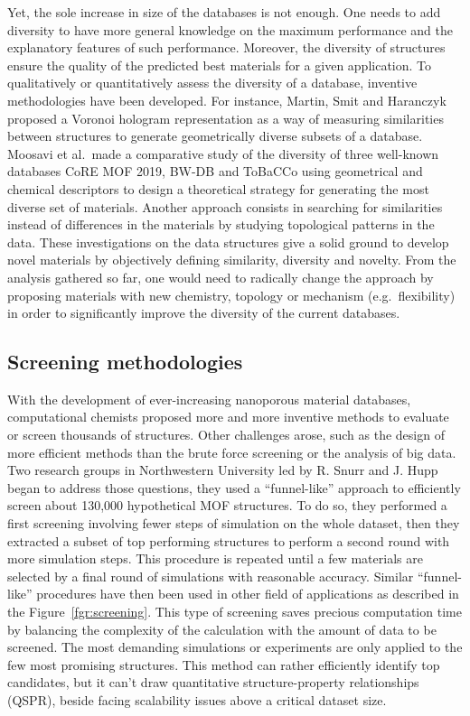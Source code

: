 \documentclass[main.tex]{subfiles}
\begin{document}
Yet, the sole increase in size of the databases is not enough. One needs to add diversity to have more general knowledge on the maximum performance and the explanatory features of such performance. Moreover, the diversity of structures ensure the quality of the predicted best materials for a given application. To qualitatively or quantitatively assess the diversity of a database, inventive methodologies have been developed. For instance, Martin, Smit and Haranczyk proposed a Voronoi hologram representation as a way of measuring similarities between structures to generate geometrically diverse subsets of a database.\cite{Martin_2011} Moosavi et al.\ made a comparative study of the diversity of three well-known databases CoRE MOF 2019,\cite{Chung_2019} BW-DB\cite{Boyd_2016} and ToBaCCo\cite{Gomez_Gualdron_2016, Colon_2017}  using geometrical and chemical descriptors to design a theoretical strategy for generating the most diverse set of materials.\cite{Moosavi_2020} Another approach consists in searching for similarities instead of differences in the materials by studying topological patterns in the data.\cite{Lee_2017} These investigations on the data structures give a solid ground to develop novel materials by objectively defining similarity, diversity and novelty. From the analysis gathered so far, one would need to radically change the approach by proposing materials with new chemistry, topology or mechanism (e.g.\ flexibility) in order to significantly improve the diversity of the current databases.


\subsection{Screening methodologies}


With the development of ever-increasing nanoporous material databases, computational chemists proposed more and more inventive methods to evaluate or screen thousands of structures. Other challenges arose, such as the design of more efficient methods than the brute force screening or the analysis of big data. Two research groups in Northwestern University led by R. Snurr and J. Hupp began to address those questions, they used a ``funnel-like'' approach to efficiently screen about 130,000 hypothetical MOF structures.\cite{Wilmer_2012} To do so, they performed a first screening involving fewer steps of simulation on the whole dataset, then they extracted a subset of top performing structures to perform a second round with more simulation steps. This procedure is repeated until a few materials are selected by a final round of simulations with reasonable accuracy. Similar ``funnel-like'' procedures have then been used in other field of applications as described in the Figure~\ref{fgr:screening}. This type of screening saves precious computation time by balancing the complexity of the calculation with the amount of data to be screened. The most demanding simulations or experiments are only applied to the few most promising structures. This method can rather efficiently identify top candidates, but it can't draw quantitative structure-property relationships (QSPR), beside facing scalability issues above a critical dataset size.
\end{document}
